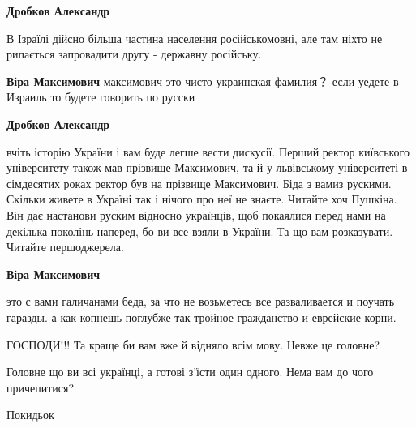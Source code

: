 \begin{itemize}
\begin{itemize}
\textbf{Дробков Александр} 

В Ізраїлі дійсно більша частина населення російськомовні, але там ніхто не рипається запровадити другу - державну російську.


 
\textbf{Віра Максимович} максимович это чисто украинская фамилия？ если уедете в Израиль то будете говорить по русски

 
\textbf{Дробков Александр} 

вчіть історію України і вам буде легше вести дискусії. Перший ректор київського
університету також мав прізвище Максимович, та й у львівському університеті в
сімдесятих роках ректор був на прізвище Максимович. Біда з вамиз рускими.
Скільки живете в Україні так і нічого про неї не знаєте. Читайте хоч Пушкіна.
Він дає настанови руским відносно українців, щоб покаялися перед нами на
декілька поколінь наперед, бо ви все взяли в України. Та що вам розказувати.
Читайте першоджерела.


 
\textbf{Віра Максимович} 

это с вами галичанами беда, за что не возьметесь все разваливается и поучать
гаразды. а как копнешь поглубже так тройное гражданство и еврейские корни.

\end{itemize}

 

ГОСПОДИ!!! Та краще би вам вже й відняло всім мову. Невже це головне?

Головне що ви всі українці, а готові з'їсти один одного. Нема вам до чого
причепитися?


 
Покидьок


\end{itemize}

